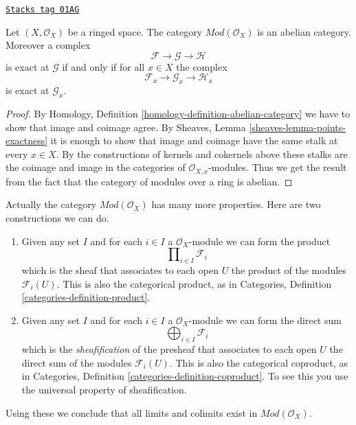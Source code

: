 \begin{lemma}[Abelian]
\label{modules-lemma-abelian}
\href{https://stacks.math.columbia.edu/tag/01AG}{\texttt{Stacks tag 01AG}}

Let $(X, \mathcal{O}_X)$ be a ringed space. The category
$\textit{Mod}(\mathcal{O}_X)$ is an abelian category. Moreover
a complex
$$
\mathcal{F} \to \mathcal{G} \to \mathcal{H}
$$
is exact at $\mathcal{G}$ if and only if for all $x \in X$ the
complex
$$
\mathcal{F}_x \to \mathcal{G}_x \to \mathcal{H}_x
$$
is exact at $\mathcal{G}_x$.
\end{lemma}

\begin{proof}
By Homology, Definition \ref{homology-definition-abelian-category}
we have to show that image and coimage agree. By Sheaves,
Lemma \ref{sheaves-lemma-points-exactness} it is enough to show
that image and coimage have the same stalk at every $x \in X$.
By the constructions of kernels and cokernels above these stalks
are the coimage and image in the categories of $\mathcal{O}_{X, x}$-modules.
Thus we get the result from the fact that the category of modules
over a ring is abelian.
\end{proof}

Actually the category $\textit{Mod}(\mathcal{O}_X)$ has many more properties.
Here are two constructions we can do.
\begin{enumerate}
\item Given any set $I$ and for each $i \in I$ a $\mathcal{O}_X$-module
we can form the product
$$
\prod\nolimits_{i \in I} \mathcal{F}_i
$$
which is the sheaf that associates to each open $U$ the
product of the modules $\mathcal{F}_i(U)$. This is also the
categorical product, as in
Categories, Definition \ref{categories-definition-product}.
\item Given any set $I$ and for each $i \in I$ a $\mathcal{O}_X$-module
we can form the direct sum
$$
\bigoplus\nolimits_{i \in I} \mathcal{F}_i
$$
which is the {\it sheafification} of the presheaf
that associates to each open $U$ the
direct sum of the modules $\mathcal{F}_i(U)$.
This is also the categorical coproduct, as in
Categories, Definition \ref{categories-definition-coproduct}.
To see this you use the universal property of sheafification.
\end{enumerate}
Using these we conclude that all limits and colimits exist in
$\textit{Mod}(\mathcal{O}_X)$.

